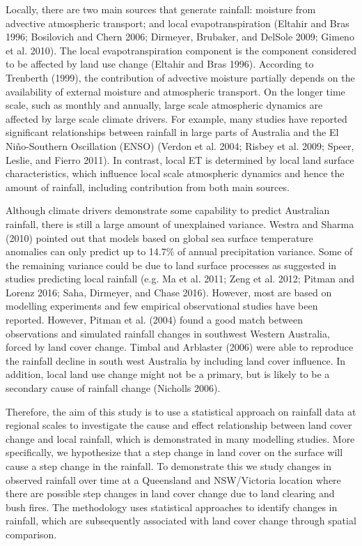 \documentclass[fleqn,10pt,lineno]{wlpeerj} %
\begin{document}
Locally, there are two main sources that generate rainfall: moisture
from advective atmospheric transport; and local evapotranspiration
(Eltahir and Bras 1996; Bosilovich and Chern 2006; Dirmeyer, Brubaker,
and DelSole 2009; Gimeno et al. 2010). The local evapotranspiration
component is the component considered to be affected by land use change
(Eltahir and Bras 1996). According to Trenberth (1999), the contribution
of advective moisture partially depends on the availability of external
moisture and atmospheric transport. On the longer time scale, such as
monthly and annually, large scale atmospheric dynamics are affected by
large scale climate drivers. For example, many studies have reported
significant relationships between rainfall in large parts of Australia
and the El Niño-Southern Oscillation (ENSO) (Verdon et al. 2004; Risbey
et al. 2009; Speer, Leslie, and Fierro 2011). In contrast, local ET is
determined by local land surface characteristics, which influence local
scale atmospheric dynamics and hence the amount of rainfall, including
contribution from both main sources.

Although climate drivers demonstrate some capability to predict
Australian rainfall, there is still a large amount of unexplained
variance. Westra and Sharma (2010) pointed out that models based on
global sea surface temperature anomalies can only predict up to 14.7\%
of annual precipitation variance. Some of the remaining variance could
be due to land surface processes as suggested in studies predicting
local rainfall (e.g. Ma et al. 2011; Zeng et al. 2012; Pitman and Lorenz
2016; Saha, Dirmeyer, and Chase 2016). However, most are based on
modelling experiments and few empirical observational studies have been
reported. However, Pitman et al. (2004) found a good match between
observations and simulated rainfall changes in southwest Western
Australia, forced by land cover change. Timbal and Arblaster (2006) were
able to reproduce the rainfall decline in south west Australia by
including land cover influence. In addition, local land use change might
not be a primary, but is likely to be a secondary cause of rainfall
change (Nicholls 2006).

Therefore, the aim of this study is to use a statistical approach on
rainfall data at regional scales to investigate the cause and effect
relationship between land cover change and local rainfall, which is
demonstrated in many modelling studies. More specifically, we
hypothesize that a step change in land cover on the surface will cause a
step change in the rainfall. To demonstrate this we study changes in
observed rainfall over time at a Queensland and NSW/Victoria location
where there are possible step changes in land cover change due to land
clearing and bush fires. The methodology uses statistical approaches to
identify changes in rainfall, which are subsequently associated with
land cover change through spatial comparison.
\end{document}
